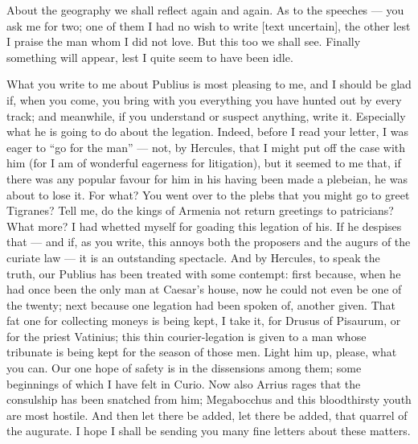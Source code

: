 

 About the geography we shall reflect again and again. As to the speeches --- you ask me for two; one of them I had no wish to write [text uncertain], the other lest I praise the man whom I did not love. But this too we shall see. Finally something will appear, lest I quite seem to have been idle.

 What you write to me about Publius is most pleasing to me, and I should be glad if, when you come, you bring with you everything you have hunted out by every track; and meanwhile, if you understand or suspect anything, write it. Especially what he is going to do about the legation. Indeed, before I read your letter, I was eager to ``go for the man'' --- not, by Hercules, that I might put off the case with him (for I am of wonderful eagerness for litigation), but it seemed to me that, if there was any popular favour for him in his having been made a plebeian, he was about to lose it. For what? You went over to the plebs that you might go to greet Tigranes? Tell me, do the kings of Armenia not return greetings to patricians? What more? I had whetted myself for goading this legation of his. If he despises that --- and if, as you write, this annoys both the proposers and the augurs of the curiate law --- it is an outstanding spectacle. And by Hercules, to speak the truth, our Publius has been treated with some contempt: first because, when he had once been the only man at Caesar's house, now he could not even be one of the twenty; next because one legation had been spoken of, another given. That fat one for collecting moneys is being kept, I take it, for Drusus of Pisaurum, or for the priest Vatinius; this thin courier-legation is given to a man whose tribunate is being kept for the season of those men. Light him up, please, what you can. Our one hope of safety is in the dissensions among them; some beginnings of which I have felt in Curio. Now also Arrius rages that the consulship has been snatched from him; Megabocchus and this bloodthirsty youth are most hostile. And then let there be added, let there be added, that quarrel of the augurate. I hope I shall be sending you many fine letters about these matters.

